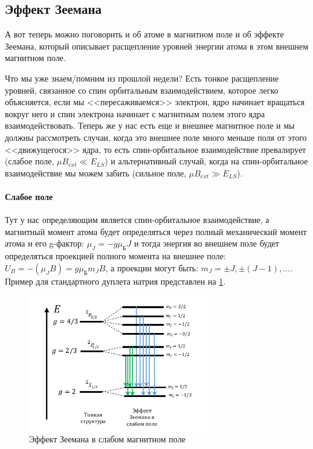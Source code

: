 \documentclass[12pt]{article}
\begin{document}
\subsection{Эффект Зеемана}
А вот теперь можно поговорить и об атоме в магнитном поле и об эффекте Зеемана, который описывает расщепление уровней энергии атома в этом внешнем магнитном поле.

Что мы уже знаем/помним из прошлой недели? Есть тонкое расщепление уровней, связанное со спин орбитальным взаимодействием, которое легко объясняется, если мы <<пересаживаемся>> электрон, ядро начинает вращаться вокруг него и спин электрона начинает с магнитным полем этого ядра взаимодействовать. Теперь же у нас есть еще и внешнее магнитное поле и мы должны рассмотреть случаи, когда это внешнее поле много меньше поля от этого <<движущегося>> ядра, то есть спин-орбитальное взаимодействие превалирует (слабое поле, $\mu B_{ext} \ll E_{LS}$) и альтернативный случай, когда на спин-орбитальное взаимодействие мы можем забить (сильное поле, $\mu B_{ext} \gg E_{LS}$).

\paragraph{Слабое поле} Тут у нас определяющим является спин-орбитальное взаимодействие, а магнитный момент атома будет определяться через полный механический момент атома и его g-фактор: $\mu_J = -g\mu_{\text{Б}}J$ и тогда энергия во внешнем поле будет определяться проекцией полного момента на внешнее поле: $U_B = -(\mu_J B) = g\mu_{\text{Б}}m_JB$, а проекции могут быть: $m_J = \pm J, \pm (J-1), \dots$. Пример для стандартного дуплета натрия представлен на \ref{fig:sem_08_weak_zeeman}.

\begin{figure}[h]
    \centering
    \includegraphics[width=0.7\textwidth,height=\textheight,keepaspectratio]{Seminar_08/pics/pic_03.pdf}
    \caption{Эффект Зеемана в слабом магнитном поле}
    \label{fig:sem_08_weak_zeeman}
\end{figure}
\end{document}
